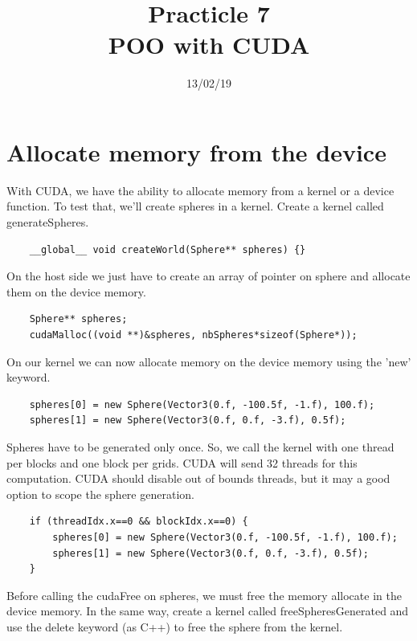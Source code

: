 \documentclass{article}
\begin{document}
\title{Practicle 7\\POO with CUDA}
\date{13/02/19}
\maketitle

\begin{abstract}
	
\end{abstract}

\section{Allocate memory from the device}
With CUDA, we have the ability to allocate memory from a kernel or a device function. To test that, we'll create spheres in a kernel. Create a kernel called generateSpheres.
\begin{lstlisting}
	__global__ void createWorld(Sphere** spheres) {}
\end{lstlisting}
On the host side we just have to create an array of pointer on sphere and allocate them on the device memory.
\begin{lstlisting}
	Sphere** spheres;
	cudaMalloc((void **)&spheres, nbSpheres*sizeof(Sphere*));
\end{lstlisting}

On our kernel we can now allocate memory on the device memory using the 'new' keyword.
\begin{lstlisting}
	spheres[0] = new Sphere(Vector3(0.f, -100.5f, -1.f), 100.f);
	spheres[1] = new Sphere(Vector3(0.f, 0.f, -3.f), 0.5f);
\end{lstlisting}

Spheres have to be generated only once. So, we call the kernel with one thread per blocks and one block per grids. CUDA will send 32 threads for this computation. CUDA should disable out of bounds threads, but it may a good option to scope the sphere generation.
\begin{lstlisting}
	if (threadIdx.x==0 && blockIdx.x==0) {
		spheres[0] = new Sphere(Vector3(0.f, -100.5f, -1.f), 100.f);
		spheres[1] = new Sphere(Vector3(0.f, 0.f, -3.f), 0.5f);
	}
\end{lstlisting}

Before calling the cudaFree on spheres, we must free the memory allocate in the device memory. In the same way, create a kernel called freeSpheresGenerated and use the delete keyword (as C++) to free the sphere from the kernel.
\end{document}
